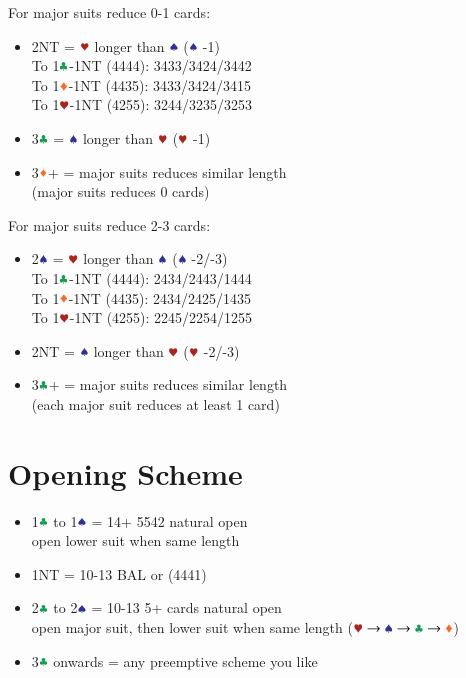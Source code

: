 \documentclass{article}
\newcommand*{\ccc}{\textcolor{ForestGreen}{\clubsuit}}
\newcommand*{\ddd}{\textcolor{Orange}{\vardiamondsuit}}
\newcommand*{\hhh}{\textcolor{Mahogany}{\varheartsuit}}
\newcommand*{\sss}{\textcolor{Blue}{\spadesuit}}
\begin{document}
\begin{multicols}{2}
\noindent For major suits reduce 0-1 cards:
\begin{itemize}
    \setlength\itemsep{-0.2em}
    \item 2NT = $\hhh$ longer than $\sss$ ($\sss$ -1) \\
        To 1$\ccc$-1NT (4444): 3433/3424/3442 \\
        To 1$\ddd$-1NT (4435): 3433/3424/3415 \\
        To 1$\hhh$-1NT (4255): 3244/3235/3253
    \item 3$\ccc$ = $\sss$ longer than $\hhh$ ($\hhh$ -1)
    \item 3$\ddd$+ = major suits reduces similar length \\
        (major suits reduces 0 cards)
\end{itemize}

\noindent For major suits reduce 2-3 cards:
\begin{itemize}
    \setlength\itemsep{-0.2em}
    \item 2$\sss$ = $\hhh$ longer than $\sss$ ($\sss$ -2/-3) \\
        To 1$\ccc$-1NT (4444): 2434/2443/1444 \\
        To 1$\ddd$-1NT (4435): 2434/2425/1435 \\
        To 1$\hhh$-1NT (4255): 2245/2254/1255
    \item 2NT = $\sss$ longer than $\hhh$ ($\hhh$ -2/-3)
    \item 3$\ccc$+ = major suits reduces similar length \\
        (each major suit reduces at least 1 card)
\end{itemize}

\section{Opening Scheme}
\begin{itemize}
    \setlength\itemsep{-0.2em}
    \item 1$\ccc$ to 1$\sss$ = 14+ 5542 natural open \\
        open lower suit when same length
    \item 1NT = 10-13 BAL or (4441)
    \item 2$\ccc$ to 2$\sss$ = 10-13 5+ cards natural open \\
        open major suit, then lower suit when same length
        ($\hhh \rightarrow \sss \rightarrow \ccc \rightarrow \ddd$)
    \item 3$\ccc$ onwards = any preemptive scheme you like
\end{itemize}


\end{multicols}
\end{document}
